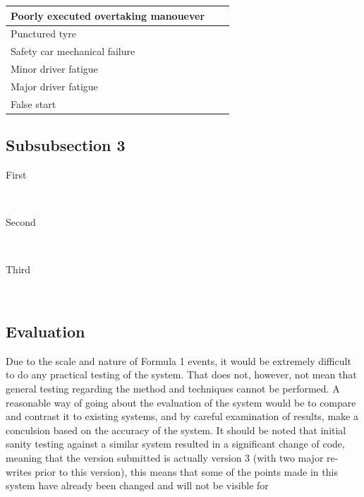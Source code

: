 \documentclass[12pt]{article} %
\begin{document}
\begin{center}
\begin{longtable}{p{4cm} | p{6cm}| p{6cm}}
		Poorly executed overtaking manouever \\ \hline


		Punctured tyre \\ \hline


		Safety car mechanical failure \\ \hline


		Minor driver fatigue \\ \hline


		Major driver fatigue \\ \hline


		False start \\ \hline
		
	\end{longtable}
\end{center}



\subsection{Subsubsection 3} %

\begin{description} %

\item[First] \hfill \\
\lipsum[9] %

\item[Second] \hfill \\
\lipsum[10] %

\item[Third] \hfill \\
\lipsum[11] %

\end{description} 


\subsection{Evaluation}

Due to the scale and nature of Formula 1 events, it would be extremely difficult to do any practical testing of the system. That does not, however, not mean that general testing regarding the method and techniques cannot be performed. A reasonable way of going about the evaluation of the system would be to compare and contrast it to existing systems, and by careful examination of results, make a conculsion based on the accuracy of the system. It should be noted that initial sanity testing against a similar system resulted in a significant change of code, meaning that the version submitted is actually version 3 (with two major re-writes prior to this version), this means that some of the points made in this system have already been changed and will not be visible for 
\end{document}
